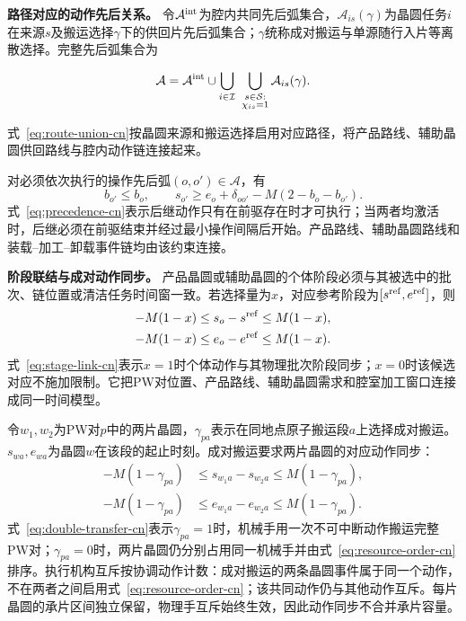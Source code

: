 \documentclass[final,5p,times,twocolumn]{elsarticle}
\begin{document}
\noindent\textbf{路径对应的动作先后关系。}
令$\mathcal A^{\rm int}$为腔内共同先后弧集合，$\mathcal A_{is}(\gamma)$为晶圆任务$i$在来源$s$及搬运选择$\gamma$下的供回片先后弧集合；$\gamma$统称成对搬运与单源随行入片等离散选择。完整先后弧集合为

\begin{equation}
\mathcal A=\mathcal A^{\rm int}\cup
\bigcup_{i\in\mathcal I}\ \bigcup_{\substack{s\in\mathcal S:\\ \chi_{is}=1}}\mathcal A_{is}(\gamma).
\label{eq:route-union-cn}
\end{equation}

式~\eqref{eq:route-union-cn}按晶圆来源和搬运选择启用对应路径，将产品路线、辅助晶圆供回路线与腔内动作链连接起来。

对必须依次执行的操作先后弧$(o,o')\in\mathcal A$，有
\begin{equation}
b_{o'}\le b_o,\qquad
s_{o'}\ge e_o+\delta_{oo'}-M(2-b_o-b_{o'}).
\label{eq:precedence-cn}
\end{equation}
式~\eqref{eq:precedence-cn}表示后继动作只有在前驱存在时才可执行；当两者均激活时，后继必须在前驱结束并经过最小操作间隔后开始。产品路线、辅助晶圆路线和装载--加工--卸载事件链均由该约束连接。

\noindent\textbf{阶段联结与成对动作同步。}
产品晶圆或辅助晶圆的个体阶段必须与其被选中的批次、链位置或清洁任务时间窗一致。若选择量为$x$，对应参考阶段为$[s^{\rm ref},e^{\rm ref}]$，则
\begin{equation}
\begin{aligned}
-M(1-x)&\le s_o-s^{\rm ref}\le M(1-x),\\
-M(1-x)&\le e_o-e^{\rm ref}\le M(1-x).
\end{aligned}
\label{eq:stage-link-cn}
\end{equation}
式~\eqref{eq:stage-link-cn}表示$x=1$时个体动作与其物理批次阶段同步；$x=0$时该候选对应不施加限制。它把PW对位置、产品路线、辅助晶圆需求和腔室加工窗口连接成同一时间模型。

令$w_1,w_2$为PW对$p$中的两片晶圆，$\gamma_{pa}$表示在同地点原子搬运段$a$上选择成对搬运。$s_{wa},e_{wa}$为晶圆$w$在该段的起止时刻。成对搬运要求两片晶圆的对应动作同步：
\begin{equation}
\begin{aligned}
-M(1-\gamma_{pa})&\le s_{w_1a}-s_{w_2a}\le M(1-\gamma_{pa}),\\
-M(1-\gamma_{pa})&\le e_{w_1a}-e_{w_2a}\le M(1-\gamma_{pa}).
\end{aligned}
\label{eq:double-transfer-cn}
\end{equation}
式~\eqref{eq:double-transfer-cn}表示$\gamma_{pa}=1$时，机械手用一次不可中断动作搬运完整PW对；$\gamma_{pa}=0$时，两片晶圆仍分别占用同一机械手并由式~\eqref{eq:resource-order-cn}排序。执行机构互斥按协调动作计数：成对搬运的两条晶圆事件属于同一个动作，不在两者之间启用式~\eqref{eq:resource-order-cn}；该共同动作仍与其他动作互斥。每片晶圆的承片区间独立保留，物理手互斥始终生效，因此动作同步不合并承片容量。
\end{document}
